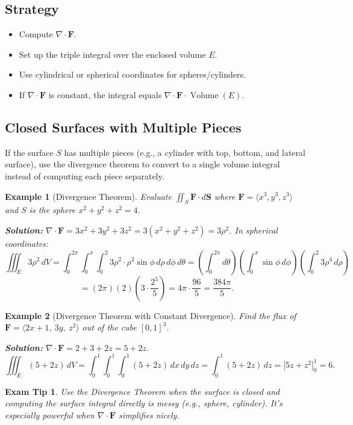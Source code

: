 \documentclass[12pt]{article}
\newcommand{\divg}{\nabla\cdot}
\newtheorem{example}{Example}[section]
\newtheorem{tip}{Exam Tip}[section]
\begin{document}
\subsection{Strategy}
\begin{itemize}
    \item Compute \(\divg\mathbf{F}\).
    \item Set up the triple integral over the enclosed volume \(E\).
    \item Use cylindrical or spherical coordinates for spheres/cylinders.
    \item If \(\divg\mathbf{F}\) is constant, the integral equals \(\divg\mathbf{F}\cdot \operatorname{Volume}(E)\).
\end{itemize}

\subsection{Closed Surfaces with Multiple Pieces}
If the surface \(S\) has multiple pieces (e.g., a cylinder with top, bottom, and lateral surface), use the divergence theorem to convert to a single volume integral instead of computing each piece separately.

\begin{example}[Divergence Theorem]
Evaluate \(\iint_S \mathbf{F}\cdot d\mathbf{S}\) where \(\mathbf{F}=\langle x^3, y^3, z^3\rangle\) and \(S\) is the sphere \(x^2+y^2+z^2=4\).

\textbf{Solution:} \(\divg\mathbf{F}=3x^2+3y^2+3z^2 = 3(x^2+y^2+z^2)=3\rho^2\). In spherical coordinates:
\[
\iiint_E 3\rho^2\,dV = \int_0^{2\pi}\int_0^{\pi}\int_0^2 3\rho^2\cdot\rho^2\sin\phi\,d\rho\,d\phi\,d\theta = \left(\int_0^{2\pi}d\theta\right)\left(\int_0^{\pi}\sin\phi\,d\phi\right)\left(\int_0^2 3\rho^4\,d\rho\right)
\]
\[
= (2\pi)(2)\left(3\cdot\frac{2^5}{5}\right) = 4\pi\cdot\frac{96}{5} = \frac{384\pi}{5}.
\]
\end{example}

\begin{example}[Divergence Theorem with Constant Divergence]
Find the flux of \(\mathbf{F}=\langle 2x+1,\ 3y,\ z^2\rangle\) out of the cube \([0,1]^3\).

\textbf{Solution:} \(\divg\mathbf{F}=2+3+2z=5+2z\).
\[
\iiint_E (5+2z)\,dV = \int_0^1\int_0^1\int_0^1 (5+2z)\,dx\,dy\,dz = \int_0^1 (5+2z)\,dz = \bigl[5z+z^2\bigr]_0^1 = 6.
\]
\end{example}

\begin{tip}
Use the Divergence Theorem when the surface is closed and computing the surface integral directly is messy (e.g., sphere, cylinder). It's especially powerful when \(\divg\mathbf{F}\) simplifies nicely.
\end{tip}
\end{document}
